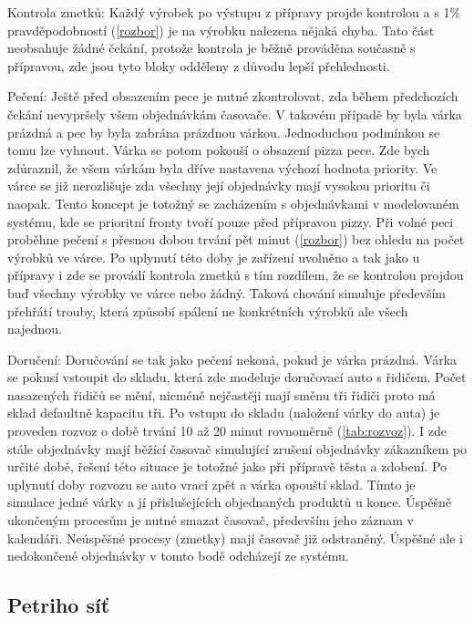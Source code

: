 \documentclass[a4paper, 12pt]{article}[9.12.2013]
\begin{document}
Kontrola zmetků: Každý výrobek po výstupu z přípravy projde kontrolou a s 1\% pravděpodobností
(\ref{rozbor}) je na výrobku nalezena nějaká chyba. Tato část neobsahuje
žádné čekání, protože kontrola je běžně prováděna současně s přípravou, zde
jsou tyto bloky odděleny z důvodu lepší přehlednosti.

Pečení: Ještě před obsazením pece je nutné zkontrolovat, zda během předchozích
čekání nevypršely všem objednávkám časovače. V takovém případě by byla várka
prázdná a pec by byla zabrána prázdnou várkou. Jednoduchou podmínkou se tomu
lze vyhnout. Várka se potom pokouší o obsazení pizza pece. Zde bych zdůraznil,
že všem várkám byla dříve nastavena výchozí hodnota priority. Ve várce se již
nerozlišuje zda všechny její objednávky mají vysokou prioritu či naopak. Tento
koncept je totožný se zacházením s objednávkami v modelovaném systému, kde se
prioritní fronty tvoří pouze před přípravou pizzy. Při volné peci proběhne
pečení s přesnou dobou trvání pět minut (\ref{rozbor}) bez ohledu na počet
výrobků ve várce. Po uplynutí této doby je zařízení uvolněno a tak jako u
přípravy i zde se provádí kontrola zmetků s tím rozdílem, že se kontrolou
projdou buď všechny výrobky ve várce nebo žádný. Taková chování simuluje
především přehřátí trouby, která způsobí spálení ne konkrétních výrobků ale
všech najednou.

Doručení: Doručování se tak jako pečení nekoná, pokud je várka prázdná. Várka se pokusí
vstoupit do skladu, která zde modeluje doručovací auto s řidičem. Počet
nasazených řidičů se mění, nicméně nejčastěji mají směnu tři řidiči
proto má sklad defaultně kapacitu tři. Po vstupu do skladu (naložení várky do auta)
je proveden rozvoz o době trvání 10 až 20 minut rovnoměrně (\ref{tab:rozvoz}). I zde
stále objednávky mají běžící časovač simulující zrušení objednávky zákazníkem
po určité době, řešení této situace je totožné jako při přípravě těsta a
zdobení. Po uplynutí doby rozvozu se auto vrací zpět a várka opouští sklad.
Tímto je simulace jedné várky a jí přislušejících objednaných produktů u
konce. Úspěšně ukončeným procesům je nutné smazat časovač, především jeho
záznam v kalendáři. Neúspěšné procesy (zmetky) mají časovač již odstraněný.
Úspěšné ale i nedokončené objednávky v tomto bodě odcházejí ze systému.

\subsection{Petriho síť} \label{koncepce:ps}
\end{document}
